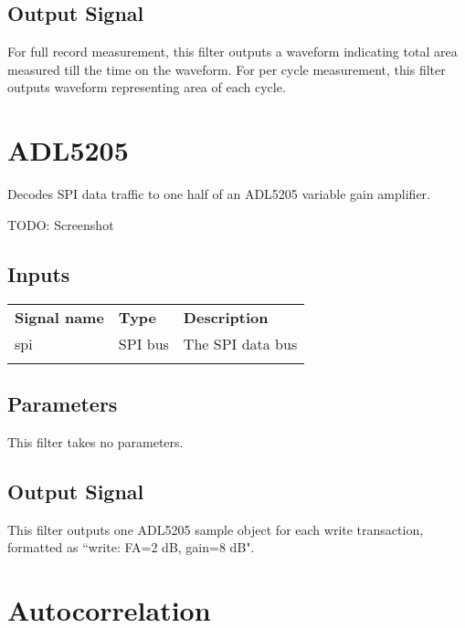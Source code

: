 \subsection{Output Signal}

For full record measurement, this filter outputs a waveform indicating total area measured till the time on the waveform.
For per cycle measurement, this filter outputs waveform representing area of each cycle.

\pagebreak
\section{ADL5205}
\label{filter:adl5205}

Decodes SPI data traffic to one half of an ADL5205 variable gain amplifier.

TODO: Screenshot

\subsection{Inputs}

\begin{tabularx}{16cm}{llX}
\thickhline
\textbf{Signal name} & \textbf{Type} & \textbf{Description} \\
\thickhline
spi & SPI bus & The SPI data bus \\
\thickhline
\end{tabularx}

\subsection{Parameters}

This filter takes no parameters.

\subsection{Output Signal}

This filter outputs one ADL5205 sample object for each write transaction, formatted as ``write: FA=2 dB, gain=8 dB".

\pagebreak
\section{Autocorrelation}
\label{filter:autocorrelation}

